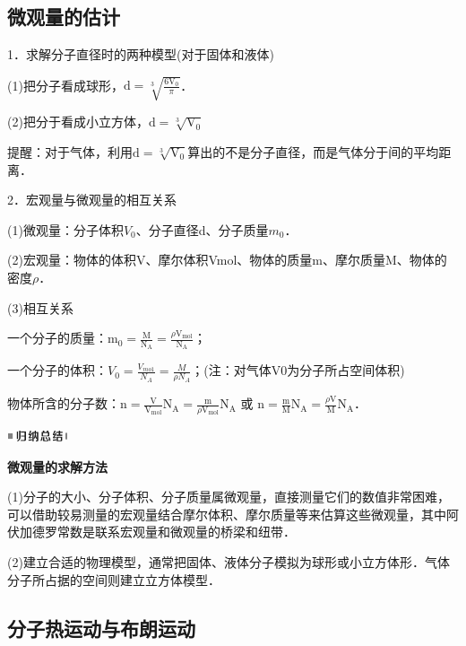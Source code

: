 \newpage
\subsection{微观量的估计}

1．求解分子直径时的两种模型(对于固体和液体)

(1)把分子看成球形，$\mathrm{d}=\sqrt[3]{\frac{6 \mathrm{V}_{0}}{\pi}}$．

(2)把分于看成小立方体，$\mathrm{d}=\sqrt[3]{\mathrm{V}_{0}}$

提醒：对于气体，利用$\mathrm{d}=\sqrt[3]{\mathrm{V}_{0}}$算出的不是分子直径，而是气体分于间的平均距离．

2．宏观量与微观量的相互关系

(1)微观量：分子体积$V_0$、分子直径d、分子质量$m_0$．

(2)宏观量：物体的体积V、摩尔体积Vmol、物体的质量m、摩尔质量M、物体的密度$\rho$．

(3)相互关系

一个分子的质量：$\mathrm{m}_{0}=\frac{\mathrm{M}}{\mathrm{N}_{\mathrm{A}}}=\frac{\rho \mathrm{V}_{\mathrm{mol}}}{\mathrm{N}_{\mathrm{A}}}$；

一个分子的体积：$V_{0}=\frac{V_{m o 1}}{N_{A}}=\frac{M}{\rho N_{A}}$；(注：对气体V0为分子所占空间体积)

物体所含的分子数：$\mathrm{n}=\frac{\mathrm{V}}{\mathrm{V}_{\mathrm{mol}}} \mathrm{N}_{\mathrm{A}}=\frac{\mathrm{m}}{\rho \mathrm{V}_{\mathrm{mol}}} \mathrm{N}_{\mathrm{A}}$ 或 $\mathrm{n}=\frac{\mathrm{m}}{\mathrm{M}} \mathrm{N}_{\mathrm{A}}=\frac{\rho \mathrm{V}}{\mathrm{M}} \mathrm{N}_{\mathrm{A}}$．

\begin{center}\includegraphics[width=0.70764in,height=0.12292in]{media/image13.png}\end{center}
\begin{center}
    \textbf{微观量的求解方法}
\end{center}

(1)分子的大小、分子体积、分子质量属微观量，直接测量它们的数值非常困难，可以借助较易测量的宏观量结合摩尔体积、摩尔质量等来估算这些微观量，其中阿伏加德罗常数是联系宏观量和微观量的桥梁和纽带．

(2)建立合适的物理模型，通常把固体、液体分子模拟为球形或小立方体形．气体分子所占据的空间则建立立方体模型．

\newpage
\subsection{分子热运动与布朗运动}

